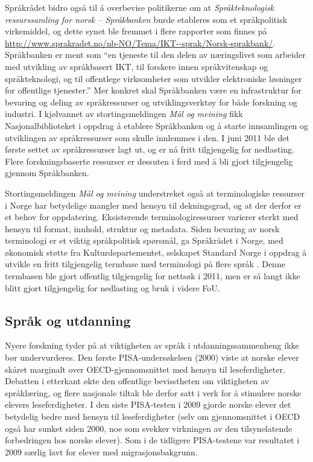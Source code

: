 \begin{multicols}{2}
Språkrådet bidro også til å overbevise politikerne om at \textit{Språkteknologisk ressurssamling for norsk -- Språkbanken} burde etableres som et språkpolitisk virkemiddel, og dette synet ble fremmet i flere rapporter som finnes på \url{http://www.sprakradet.no/nb-NO/Tema/IKT--sprak/Norsk-sprakbank/}.
Språkbanken er ment som ``en tjeneste til den delen av næringslivet som arbeider med utvikling av språkbasert IKT, til forskere innen språkvitenskap og språkteknologi, og til offentlege virksomheter som utvikler elektroniske løsninger for offentlige tjenester.''
Mer konkret skal Språkbanken være en infrastruktur for bevaring og deling av språkressurser og utviklingsverktøy for både forskning og industri.
I kjølvannet av stortingsmeldingen \textit{Mål og meining} \cite{stm35:2008} fikk Nasjonalbiblioteket i oppdrag å etablere Språkbanken og å starte innsamlingen og utviklingen av språkressurser som skulle innlemmes i den.
I juni 2011 ble det første settet av språkressurser lagt ut, og er nå fritt tilgjengelig for nedlasting. 
Flere forskningsbaserte ressurser er dessuten i ferd med å bli gjort tilgjengelig gjennom Språkbanken.

Stortingsmeldingen \textit{Mål og meining} understreket også at terminologiske ressurser i Norge har betydelige mangler med hensyn til dekningsgrad, og at der derfor er et behov for oppdatering.  Eksisterende terminologiressurser varierer sterkt med hensyn til format, innhold, struktur og metadata. 
Siden bevaring av norsk terminologi er et viktig språkpolitisk spørsmål, ga Språkrådet i Norge, med økonomisk støtte fra Kulturdepartementet, selskapet Standard Norge i oppdrag å utvikle en fritt tilgjengelig termbase med terminologi på flere språk \cite{drosdal2010}. 
Denne termbasen ble gjort offentlig tilgjengelig for nettsøk i 2011, men er så langt ikke blitt gjort tilgjengelig for nedlasting og bruk i videre FoU.
 
\subsection{Språk og utdanning}

Nyere forskning tyder på at viktigheten av språk i utdanningssammenheng ikke bør undervurderes. 
Den første PISA-undersøkelsen (2000) viste at norske elever skåret marginalt over OECD-gjennomsnittet med hensyn til leseferdigheter. 
Debatten i etterkant økte den offentlige bevisstheten om viktigheten av språklæring, og flere nasjonale tiltak ble derfor satt i verk for å stimulere norske elevers  leseferdigheter. 
I den siste PISA-testen i 2009 \cite{pisa2009eng} gjorde norske elever det betydelig bedre med hensyn til leseferdigheter (selv om gjennomsnittet i OECD også har sunket siden 2000, noe som svekker virkningen av den tilsynelatende forbedringen hos norske elever). 
Som i de tidligere PISA-testene var resultatet i 2009 særlig lavt for elever med migrasjonsbakgrunn.


\end{multicols}
